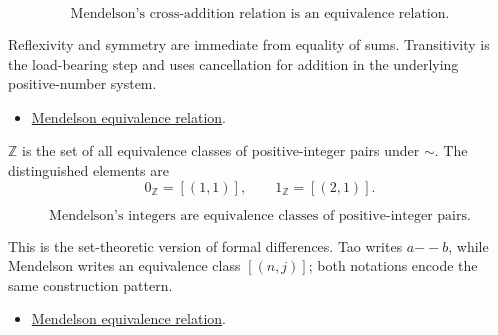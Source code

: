 \begin{remark*}
\[
  \text{Mendelson's cross-addition relation is an equivalence relation.}
\]
\end{remark*}

\begin{remark*}[Interpretation]
Reflexivity and symmetry are immediate from equality of sums. Transitivity is
the load-bearing step and uses cancellation for addition in the underlying
positive-number system.
\end{remark*}

\begin{dependencies}
\begin{itemize}
  \item \hyperref[def:men-equivalence-relation]{Mendelson equivalence relation}.
\end{itemize}
\end{dependencies}

\begin{definition}
\label{def:men-integers}
\(\mathbb{Z}\) is the set of all equivalence classes of positive-integer
pairs under \(\sim\). The distinguished elements are
\[
  0_{\mathbb{Z}}=[(1,1)],
  \qquad
  1_{\mathbb{Z}}=[(2,1)].
\]
\end{definition}


\begin{remark*}
\[
  \text{Mendelson's integers are equivalence classes of positive-integer pairs.}
\]
\end{remark*}

\begin{remark*}[Interpretation]
This is the set-theoretic version of formal differences. Tao writes
\(a {-\!\!-} b\), while Mendelson writes an equivalence class \([(n,j)]\);
both notations encode the same construction pattern.
\end{remark*}

\begin{dependencies}
\begin{itemize}
  \item \hyperref[thm:men-equiv]{Mendelson equivalence relation}.
\end{itemize}
\end{dependencies}

